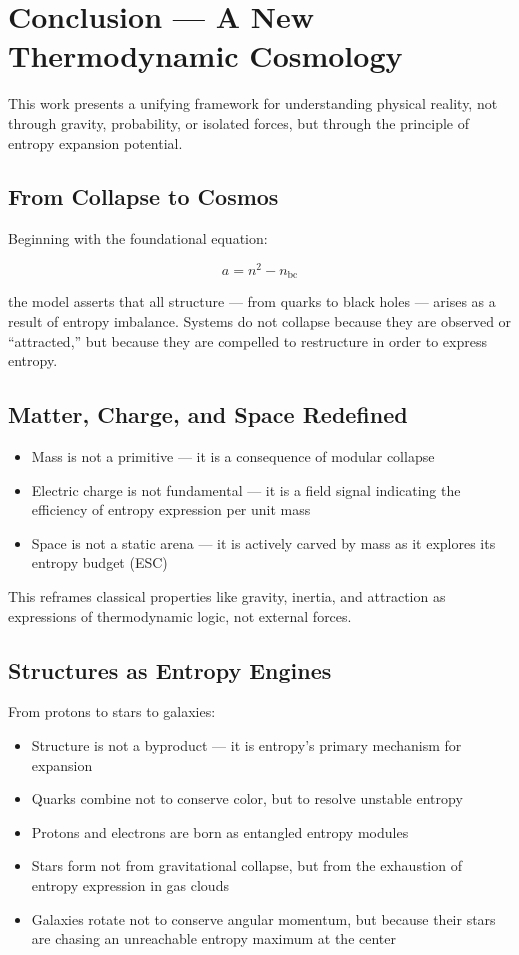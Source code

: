 \documentclass[12pt]{article}
\begin{document}
\section{Conclusion — A New Thermodynamic Cosmology}

This work presents a unifying framework for understanding physical reality, not through gravity, probability, or isolated forces, but through the principle of entropy expansion potential.

\subsection{From Collapse to Cosmos}

Beginning with the foundational equation:

\[
a = n^2 - n_{\text{bc}}
\]

the model asserts that all structure — from quarks to black holes — arises as a result of entropy imbalance. Systems do not collapse because they are observed or ``attracted,'' but because they are compelled to restructure in order to express entropy.

\subsection{Matter, Charge, and Space Redefined}

\begin{itemize}
    \item Mass is not a primitive — it is a consequence of modular collapse
    \item Electric charge is not fundamental — it is a field signal indicating the efficiency of entropy expression per unit mass
    \item Space is not a static arena — it is actively carved by mass as it explores its entropy budget (ESC)
\end{itemize}

This reframes classical properties like gravity, inertia, and attraction as expressions of thermodynamic logic, not external forces.

\subsection{Structures as Entropy Engines}

From protons to stars to galaxies:
\begin{itemize}
    \item Structure is not a byproduct — it is entropy’s primary mechanism for expansion
    \item Quarks combine not to conserve color, but to resolve unstable entropy
    \item Protons and electrons are born as entangled entropy modules
    \item Stars form not from gravitational collapse, but from the exhaustion of entropy expression in gas clouds
    \item Galaxies rotate not to conserve angular momentum, but because their stars are chasing an unreachable entropy maximum at the center
\end{itemize}
\end{document}
